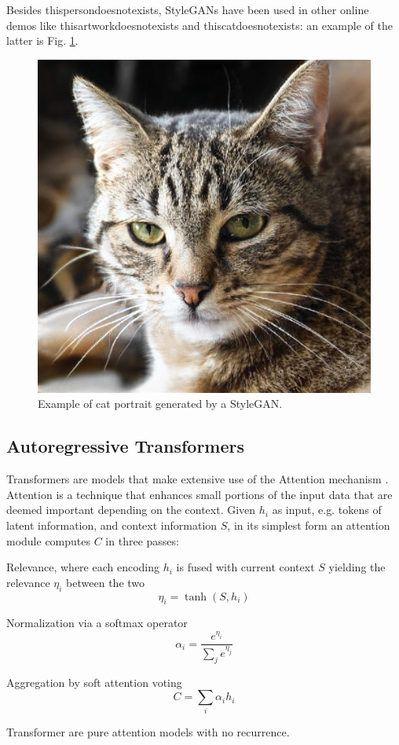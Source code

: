 \documentclass[conference]{IEEEtran}
\begin{document}
Besides thispersondoesnotexists, StyleGANs have been used in other online demos like thisartworkdoesnotexists and thiscatdoesnotexists: an example of the latter is Fig. \ref{styleganimage}.
\begin{figure}[htbp]
\centerline{\includegraphics[scale=.33]{img/stylegan.jpg}}
\caption{Example of cat portrait generated by a StyleGAN.}
\label{styleganimage}
\end{figure}
\subsection{Autoregressive Transformers}
Transformers \cite{transformer} are models that make extensive use of the Attention mechanism \cite{attention}. Attention is a technique that enhances small portions of the input data that are deemed important depending on the context. Given $h_i$ as input, e.g. tokens of latent information, and context information $S$, in its simplest form an attention module computes $C$ in three passes:
\begin{list}{-}{}
	\item Relevance, where each encoding $h_i$ is fused with current context $S$ yielding the relevance $\eta_i$ between the two
	\begin{equation}
	\eta_i = \tanh(S, h_i)
	\label{attentionrelevance}
	\end{equation}
	\item Normalization via a softmax operator
	\begin{equation}
	\alpha_i = \frac{e^{\eta_i}}{\sum_j e^{\eta_j}}
	\label{attentionnormalization}
	\end{equation}
	\item Aggregation by soft attention voting
	\begin{equation}
	C = \sum_i\alpha_ih_i
	\label{attentionaggregation}
	\end{equation}
\end{list}
Transformer are pure attention models with no recurrence.
\end{document}
